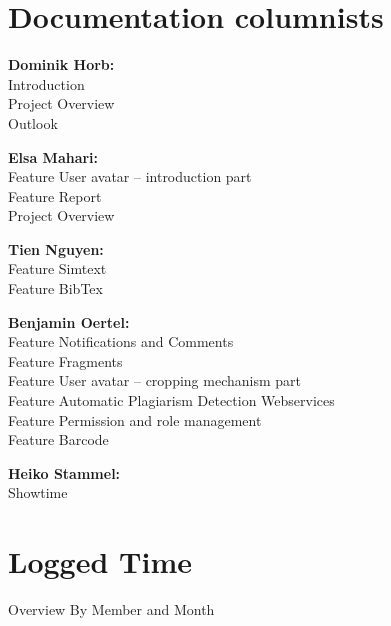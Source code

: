\begin{appendix}

\chapter{Documentation columnists}

\textbf{Dominik Horb:}\\
  Introduction\\
  Project Overview  \\
  Outlook

\textbf{Elsa Mahari:}\\
  Feature User avatar – introduction part\\
  Feature Report\\
  Project Overview

\textbf{Tien Nguyen:}\\
  Feature Simtext\\
  Feature BibTex

\textbf{Benjamin Oertel:}\\
  Feature Notifications and Comments\\
  Feature Fragments\\
  Feature User avatar – cropping mechanism part \\
  Feature Automatic Plagiarism Detection Webservices \\
  Feature Permission and role management \\
  Feature Barcode

\textbf{Heiko Stammel:}\\
  Showtime \\


\chapter{Logged Time}


\begin{table}[htbp]
  \caption{Overview By Member and Month}
  \centering
\end{table}








\end{appendix}
